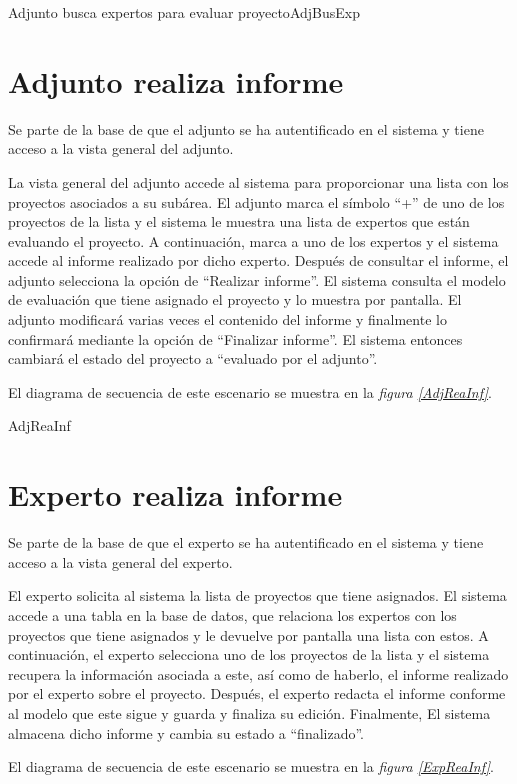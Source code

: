 \documentclass[11pt,a4paper,spanish,twoside]{book}
\begin{document}
{Adjunto busca expertos para evaluar proyecto}{AdjBusExp}

\section{Adjunto realiza informe}
Se parte de la base de que el adjunto se ha autentificado en el sistema y
tiene acceso a la vista general del adjunto.

La vista general del adjunto accede al sistema para proporcionar una lista
con los proyectos asociados a su subárea. El adjunto marca el símbolo ``+''
de uno de los proyectos de la lista y el sistema le muestra una lista de 
expertos que están evaluando el proyecto. A continuación, marca a uno de los
expertos y el sistema accede al informe realizado por dicho experto. Después
de consultar el informe, el adjunto selecciona la opción de ``Realizar
informe''. El sistema consulta el modelo de evaluación que tiene asignado el
proyecto y lo muestra por pantalla. El adjunto modificará varias veces
el contenido del informe y finalmente lo confirmará mediante la opción de
``Finalizar informe''. El sistema entonces cambiará el estado del proyecto a
``evaluado por el adjunto''.

El diagrama de secuencia de este escenario se muestra en la \emph{figura
\ref{AdjReaInf}}.

{AdjReaInf}

\section{Experto realiza informe}
Se parte de la base de que el experto se ha autentificado en el sistema y
tiene acceso a la vista general del experto.

El experto solicita al sistema la lista de proyectos que tiene asignados. El
sistema accede a una tabla en la base de datos, que relaciona los expertos con
los proyectos que tiene asignados y le devuelve por pantalla una lista con 
estos. A continuación, el experto selecciona uno de los proyectos de la lista
y el sistema recupera la información asociada a este, así como de haberlo, el
informe realizado por el experto sobre el proyecto. Después, el experto
redacta el informe conforme al modelo que este sigue y guarda y finaliza su
edición. Finalmente, El sistema almacena dicho informe y cambia su estado a
``finalizado''.

El diagrama de secuencia de este escenario se muestra en la \emph{figura
\ref{ExpReaInf}}.
\end{document}

